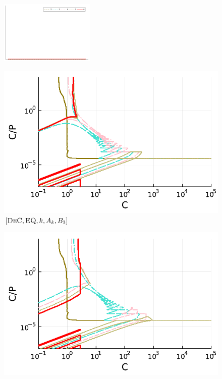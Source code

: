 \begin{figure}
	\centering
	\includegraphics[width=0.4\textwidth,trim={230 340 30 22}, clip]{pdf/pdepics/legends/colors_a-d_new_horiz_2-6_no_order.pdf}\\
	\begin{minipage}[t]{0.325\textwidth}
		\centering
		\includegraphics[width=\textwidth]{pdf/pdepics/disp/IMEXDeC_equispaced_disp_advTMM_2-6_newE.pdf}
		\small$[\textsc{DeC}, \textsc{EQ},k,A_k,B_3]$\par
	\end{minipage}
	\begin{minipage}[t]{0.325\textwidth}
	\centering
	\includegraphics[width=\textwidth]{pdf/pdepics/disp/IMEXDeC_subtimesteps_equispaced_disp_advTMM_2-6_newE.pdf}

\end{minipage}
\end{figure}
